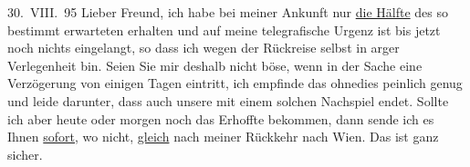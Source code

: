 \pstart
           \raggedleft{}30. VIII. 95\pend
           \vspace{0.5em}
\pstart
           Lieber Freund, ich habe bei meiner Ankunft nur \uline{die Hälfte} des so bestimmt erwarteten \label{K_L03164-1v}\label{K_L03164-1} erhalten und auf meine telegrafische Urgenz ist bis jetzt
               noch nichts eingelangt, so dass ich wegen der Rückreise selbst in arger Verlegenheit
               bin. Seien Sie mir deshalb nicht böse, wenn in der Sache eine Verzögerung von einigen
               Tagen eintritt, ich empfinde das ohnedies peinlich genug und leide darunter, dass
               auch unsere \label{K_L03164-2v}\label{K_L03164-2} mit einem solchen Nachspiel endet. Sollte ich aber heute oder morgen noch das
               Erhoffte bekommen, dann sende ich es Ihnen \uline{sofort}, wo
               nicht, \uline{gleich} nach meiner Rückkehr nach Wien. Das ist ganz sicher.\pend
           
